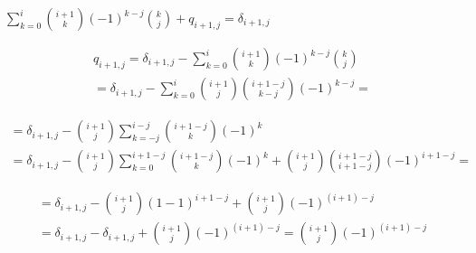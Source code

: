 \documentclass{article}
\begin{document}
\( \sum_{k=0}^{i} \binom{i+1}{k}{(-1)}^{k-j} \binom{k}{j} + q_{i+1,j} = \delta_{i+1,j} \)

\begin{multline*}
q_{i+1,j} = \delta_{i+1,j} - \sum_{k=0}^{i} \binom{i+1}{k}{(-1)}^{k-j} \binom{k}{j} \\
= \delta_{i+1,j} - \sum_{k=0}^{i} \binom{i+1}{j}\binom{i+1-j}{k-j}{(-1)}^{k-j} =
\end{multline*}

\begin{multline*}
= \delta_{i+1,j} - \binom{i+1}{j} \sum_{k=-j}^{i-j} \binom{i+1-j}{k}{(-1)}^{k} \\
= \delta_{i+1,j} - \binom{i+1}{j} \sum_{k=0}^{i+1-j} \binom{i+1-j}{k}{(-1)}^{k} + \binom{i+1}{j} \binom{i+1-j}{i+1-j}{(-1)}^{i+1-j} =
\end{multline*}

\begin{multline*}
= \delta_{i+1,j} - \binom{i+1}{j}{(1-1)}^{i+1-j} + \binom{i+1}{j}{(-1)}^{(i+1)-j} \\
= \delta_{i+1,j} - \delta_{i+1,j} + \binom{i+1}{j}{(-1)}^{(i+1)-j} = \binom{i+1}{j}{(-1)}^{(i+1)-j}
\end{multline*}
\end{document}
